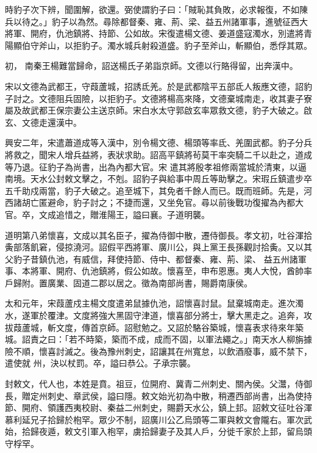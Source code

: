 \begin{pinyinscope}
 時豹子次下辨，聞圍解，欲還。弼使謂豹子曰：「賊恥其負敗，必求報復，不如陳兵以待之。」豹子以為然。尋除都督秦、雍、荊、梁、益五州諸軍事，進號征西大將軍、開府，仇池鎮將、持節、公如故。宋復遣楊文德、姜道盛寇濁水，別遣將青陽顯伯守斧山，以拒豹子。濁水城兵射殺道盛。豹子至斧山，斬顯伯，悉俘其眾。



 初，
 南秦王楊難當歸命，詔送楊氏子弟詣京師。文德以行賂得留，出奔漢中。



 宋以文德為武都王，守葭蘆城，招誘氐羌。於是武都陰平五部氐人叛應文德，詔豹子討之。文德阻兵固險，以拒豹子。文德將楊高來降，文德棄城南走，收其妻子寮屬及故武都王保宗妻公主送京師。宋白水太守郭啟玄率眾救文德，豹子大破之。啟玄、文德走還漢中。



 興安二年，宋遣蕭道成等入漢中，別令楊文德、楊頭等率氐、羌圍武都。豹子分兵將救之，聞宋人增兵益將，表狀求助。詔高平鎮將茍莫干率突騎二千以赴之，道成等乃退。征豹子為尚書，出為內都大官。宋
 遣其將殷孝祖修兩當城於清東，以逼南境。天水公封敕文擊之，不剋。詔豹子與給事中周丘等助擊之。宋瑕丘鎮遣步卒五千助戍兩當，豹子大破之。追至城下，其免者千餘人而已。既而班師。先是，河西諸胡亡匿避命，豹子討之；不捷而還，又坐免官。尋以前後戰功復擢為內都大官。卒，文成追惜之，贈淮陽王，謚曰襄。子道明襲。



 道明第八弟懷喜，文成以其名臣子，擢為侍御中散，遷侍御長。孝文初，吐谷渾拾夤部落飢窘，侵掠澆河。詔假平西將軍、廣川公，與上黨王長孫觀討拾夤。又以其父豹子昔鎮仇池，有威信，拜使持節、侍中、都督秦、雍、荊、梁、
 益五州諸軍事、本將軍、開府、仇池鎮將，假公如故。懷喜至，申布恩惠。夷人大悅，酋帥率戶歸附。置廣業、固道二郡以居之。徵為南部尚書，賜爵南康侯。



 太和元年，宋葭蘆戍主楊文度遣弟鼠據仇池，詔懷喜討鼠。鼠棄城南走。進次濁水，遂軍於覆津。文度將強大黑固守津道，懷喜部分將士，擊大黑走之。追奔，攻拔葭蘆城，斬文度，傳首京師。詔慰勉之。又詔於駱谷築城，懷喜表求待來年築城。詔責之曰：「若不時築，築而不成，成而不固，以軍法繩之。」南天水人柳旃據險不順，懷喜討滅之。後為豫州刺史，詔讓其在州寬怠，以飲酒廢事，威不禁下，遣使就
 州，決以杖罰。卒，謚曰恭公。子承宗襲。



 封敕文，代人也，本姓是賁。祖豆，位開府、冀青二州刺史、關內侯。父灊，侍御長，贈定州刺史、章武侯，謚曰隱。敕文始光初為中散，稍遷西部尚書，出為使持節、開府、領護西夷校尉、秦益二州刺史，賜爵天水公，鎮上邽。詔敕文征吐谷渾慕利延兄子拾歸於枹罕。眾少不制，詔廣川公乙烏頭等二軍與敕文會隴右。軍次武始，拾歸夜遁，敕文引軍入枹罕，虜拾歸妻子及其人戶，分徙千家於上邽，留烏頭守桴罕。




\end{pinyinscope}
